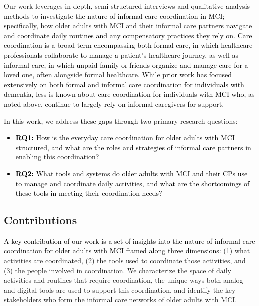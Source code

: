 \documentclass[acmsmall]{acmart}
\begin{document}
Our work leverages \textcolor{black}{in-depth, semi-structured interviews and qualitative analysis methods} to investigate \textcolor{black}{the nature of informal care coordination in MCI; specifically,} how older adults with MCI and their informal care \textcolor{black}{partners navigate and coordinate daily routines and any compensatory practices they rely on. Care coordination is a broad term encompassing both formal care, in which healthcare professionals collaborate to manage a patient's healthcare journey, as well as informal care, in which unpaid family or friends organize and manage care for a loved one, often alongside formal healthcare. While prior work has focused extensively on both formal and informal care coordination for individuals with dementia, less is known about care coordination for individuals with MCI who, as noted above, continue to largely rely on informal caregivers for support.}

\textcolor{black}{In this work, }we address \textcolor{black}{these gaps through} \textcolor{black}{two} primary research questions: 
\textcolor{black}{
\begin{itemize}
    \item \textcolor{black}{\textbf{RQ1:}} How is the everyday care coordination for older adults with MCI structured, and what are the roles and strategies of informal care partners in enabling this coordination?
    \item \textbf{RQ2:} What tools and systems \textcolor{black}{do} older adults with MCI and their CPs \textcolor{black}{use} to manage and coordinate daily activities, and \textcolor{black}{what are the shortcomings of} these tools \textcolor{black}{in} meeting their coordination needs? 
\end{itemize}
}
\subsection{Contributions}

\textcolor{black}{A key contribution of our work is a set of insights into the nature of informal care coordination for older adults with MCI framed along three dimensions:} (1) what activities are coordinated, (2) the tools used to coordinate those activities, and (3) the people involved in coordination. We characterize the space of daily activities and routines that require coordination, the unique ways both analog and digital tools are used to support this coordination, and identify the key stakeholders who form the informal care networks of older adults with MCI. 
\end{document}
